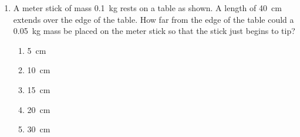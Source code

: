 \documentclass{../../../oss-apphys}
\begin{document}
\begin{multicols}{2}
\begin{enumerate}[leftmargin=18pt]
%    
    
  \item A meter stick of mass \SI{.1}{\kilo\gram} rests on a table as shown. A
    length of \SI{40}{\centi\metre} extends over the edge of the table. How far
    from the edge of the table could a \SI{.05}{\kilo\gram} mass be placed on
    the meter stick so that the stick just begins to tip?
    \begin{center}
      \vspace{-.2in}
    \end{center}
    \begin{enumerate}[noitemsep,topsep=0pt,leftmargin=18pt,label=(\Alph*)]
    \item\SI{5}{\centi\metre}
    \item\SI{10}{\centi\metre}
    \item\SI{15}{\centi\metre}
    \item\SI{20}{\centi\metre}
    \item\SI{30}{\centi\metre}
    \end{enumerate}
    \columnbreak
    

\end{enumerate}
\end{multicols}
\end{document}

